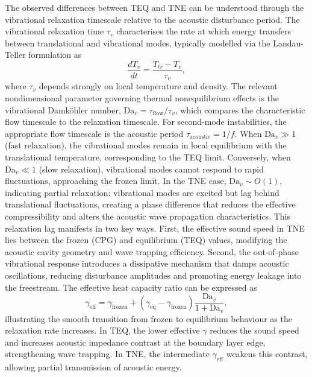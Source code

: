 The observed differences between \gls{TEQ} and \gls{TNE} can be understood through the vibrational relaxation timescale relative to the acoustic disturbance period. The vibrational relaxation time $\tau_v$ characterises the rate at which energy transfers between translational and vibrational modes, typically modelled via the Landau-Teller formulation as
\begin{equation}
\frac{dT_v}{dt} = \frac{T_{tr} - T_v}{\tau_v},
\end{equation}
where $\tau_v$ depends strongly on local temperature and density. The relevant nondimensional parameter governing thermal nonequilibrium effects is the vibrational Damköhler number, $\text{Da}_v = \tau_{\text{flow}}/\tau_v$, which compares the characteristic flow timescale to the relaxation timescale. For second-mode instabilities, the appropriate flow timescale is the acoustic period $\tau_{\text{acoustic}} = 1/f$. When $\text{Da}_v \gg 1$ (fast relaxation), the vibrational modes remain in local equilibrium with the translational temperature, corresponding to the \gls{TEQ} limit. Conversely, when $\text{Da}_v \ll 1$ (slow relaxation), vibrational modes cannot respond to rapid fluctuations, approaching the frozen limit. In the \gls{TNE} case, $\text{Da}_v \sim O(1)$, indicating partial relaxation: vibrational modes are excited but lag behind translational fluctuations, creating a phase difference that reduces the effective compressibility and alters the acoustic wave propagation characteristics. This relaxation lag manifests in two key ways. First, the effective sound speed in \gls{TNE} lies between the frozen (\gls{CPG}) and equilibrium (\gls{TEQ}) values, modifying the acoustic cavity geometry and wave trapping efficiency. Second, the out-of-phase vibrational response introduces a dissipative mechanism that damps acoustic oscillations, reducing disturbance amplitudes and promoting energy leakage into the freestream. The effective heat capacity ratio can be expressed as
\begin{equation}
\gamma_{\text{eff}} = \gamma_{\text{frozen}} + (\gamma_{\text{eq}} - \gamma_{\text{frozen}}) \frac{\text{Da}_v}{1 + \text{Da}_v},
\end{equation}
illustrating the smooth transition from frozen to equilibrium behaviour as the relaxation rate increases. In \gls{TEQ}, the lower effective $\gamma$ reduces the sound speed and increases acoustic impedance contrast at the boundary layer edge, strengthening wave trapping. In \gls{TNE}, the intermediate $\gamma_{\text{eff}}$ weakens this contrast, allowing partial transmission of acoustic energy. 



